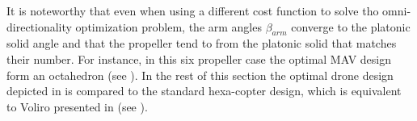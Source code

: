It is noteworthy that even when using a different cost function to solve
tho omni-directionality optimization problem, the arm angles $\beta_{arm}$
converge to the platonic solid angle and that the propeller tend to from the
platonic solid that matches their number. For instance, in this six propeller case
the optimal MAV design form an octahedron (see ).
In the rest of this section the optimal drone design depicted in
 is compared to the standard hexa-copter design,
which is equivalent to Voliro presented in \citep{kamel_voliro:_2018}
(see ).

\begin{figure}[!ht]
\end{figure}

